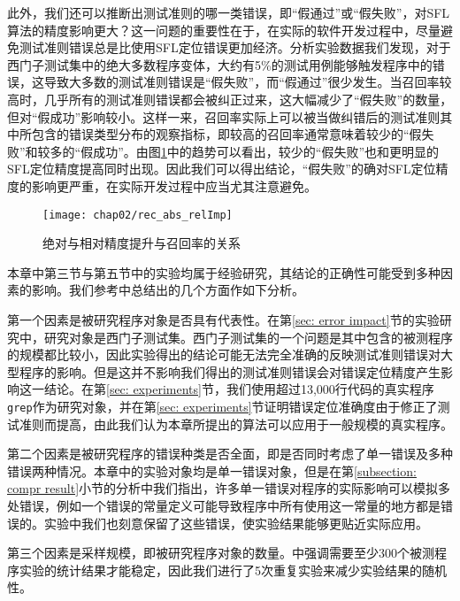 此外，我们还可以推断出测试准则的哪一类错误，即“假通过”或“假失败”，对SFL算法的精度影响更大？这一问题的重要性在于，在实际的软件开发过程中，尽量避免测试准则错误总是比使用SFL定位错误更加经济。分析实验数据我们发现，对于西门子测试集中的绝大多数程序变体，大约有5\%的测试用例能够触发程序中的错误，这导致大多数的测试准则错误是“假失败”，而“假通过”很少发生。当召回率较高时，几乎所有的测试准则错误都会被纠正过来，这大幅减少了“假失败”的数量，但对“假成功”影响较小。这样一来，召回率实际上可以被当做纠错后的测试准则其中所包含的错误类型分布的观察指标，即较高的召回率通常意味着较少的“假失败”和较多的“假成功”。由图\ref{fig:rec_abs_relImp}中的趋势可以看出，较少的“假失败”也和更明显的SFL定位精度提高同时出现。因此我们可以得出结论，“假失败”的确对SFL定位精度的影响更严重，在实际开发过程中应当尤其注意避免。

\begin{figure}
	\centering
	\texttt{[image: chap02/rec\_abs\_relImp]}
	\caption{绝对与相对精度提升与召回率的关系}
	\label{fig:rec_abs_relImp}
\end{figure}


本章中第三节与第五节中的实验均属于经验研究，其结论的正确性可能受到多种因素的影响。我们参考\cite{Steimann:2013:TVV:2483760.2483767}中总结出的几个方面作如下分析。

第一个因素是被研究程序对象是否具有代表性。在第\ref{sec: error impact}节的实验研究中，研究对象是西门子测试集。西门子测试集的一个问题是其中包含的被测程序的规模都比较小，因此实验得出的结论可能无法完全准确的反映测试准则错误对大型程序的影响。但是这并不影响我们得出的测试准则错误会对错误定位精度产生影响这一结论。在第\ref{sec: experiments}节，我们使用超过13,000行代码的真实程序\texttt{grep}作为研究对象，并在第\ref{sec: experiments}节证明错误定位准确度由于修正了测试准则而提高，由此我们认为本章所提出的算法可以应用于一般规模的真实程序。

第二个因素是被研究程序的错误种类是否全面，即是否同时考虑了单一错误及多种错误两种情况。本章中的实验对象均是单一错误对象，但是在第\ref{subsection: compr result}小节的分析中我们指出，许多单一错误对程序的实际影响可以模拟多处错误，例如一个错误的常量定义可能导致程序中所有使用这一常量的地方都是错误的。实验中我们也刻意保留了这些错误，使实验结果能够更贴近实际应用。

第三个因素是采样规模，即被研究程序对象的数量。\cite{Steimann:2013:TVV:2483760.2483767}中强调需要至少300个被测程序实验的统计结果才能稳定，因此我们进行了5次重复实验来减少实验结果的随机性。


